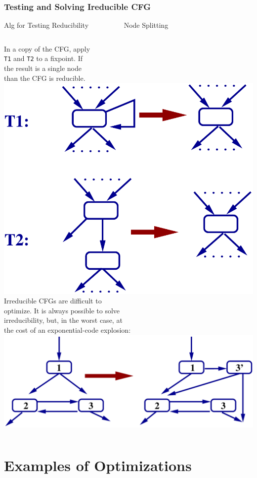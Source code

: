 \documentclass{beamer}
\begin{document}
\begin{frame}[fragile,t]
    \frametitle{Testing and Solving Ireducible CFG}

\bigskip

\begin{block}{Alg for Testing Reducibility{\tt~~~~~~~~~~}Node Splitting}
\begin{columns}
In a copy of the \textsc{CFG}, apply\\
{\tt T1} and {\tt T2} to a fixpoint. If\\
the result is a single node\\
than the \textsc{CFG} is reducible.\\
%
\includegraphics[width=17ex]{Figures/T12}
Irreducible \textsc{CFG}s are difficult to\\
optimize. It is always possible to solve\\
irreducibility, but, in the worst case, at\\
the cost of an exponential-code explosion:\\
%
\includegraphics[width=34ex]{Figures/NodeSplit}
\end{columns}
\end{block}

\end{frame}


\section{Examples of Optimizations}

\begin{frame}[fragile]
	\tableofcontents[currentsection]
\end{frame}
\end{document}
